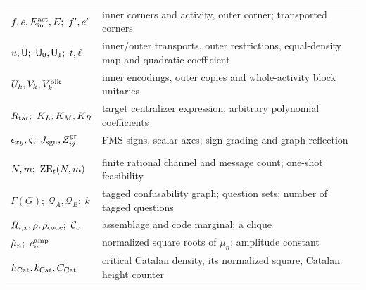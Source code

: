 \begin{center}
\begin{tabular}{@{}>{\raggedright\arraybackslash}p{.33\linewidth}>{\raggedright\arraybackslash}p{.60\linewidth}@{}}
$f,e,E^{\rm act}_{\rm in},E;\ f',e'$ & inner corners and activity, outer corner; transported corners\\
$u,\btrans;\ \btrans_0,\btrans_1;\ t,\ell$ & inner/outer transports, outer restrictions, equal-density map and quadratic coefficient\\
$U_k,V_k,V^{\rm blk}_k$ & inner encodings, outer copies and whole-activity block unitaries\\
$R_{\rm tar};\ K_L,K_M,K_R$ & target centralizer expression; arbitrary polynomial coefficients\\
$\epsilon_{xy},\varsigma;\ J_{\rm sgn},Z^{\rm gr}_{ij}$ & FMS signs, scalar axes; sign grading and graph reflection\\
\multicolumn{2}{@{}l}{\emph{Communication}}\\
$N,m;\ \ZE_t(N,m)$ & finite rational channel and message count; one-shot feasibility\\
$\Gamma(G);\ \mathcal Q_A,\mathcal Q_B;\ k$ & tagged confusability graph; question sets; number of tagged questions\\
$R_{i,x},\rho,\rho_{\rm code};\ \mathcal C_c$ & assemblage and code marginal; a clique\\
$\hat\mu_n;\ c^{\rm amp}_n$ & normalized square roots of $\mu_n$; amplitude constant\\
$h_{\mathrm{Cat}},k_{\mathrm{Cat}},C_{\mathrm{Cat}}$ & critical Catalan density, its normalized square, Catalan height counter\\
\bottomrule\end{tabular}\end{center}



